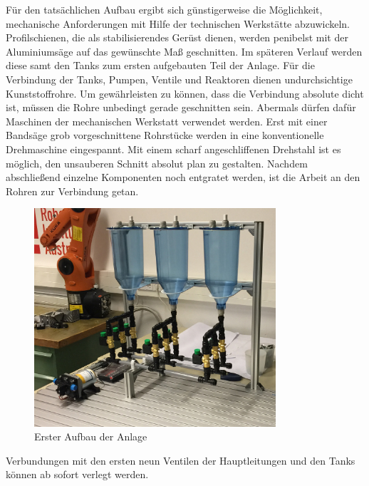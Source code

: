 	Für den tatsächlichen Aufbau ergibt sich günstigerweise die Möglichkeit, mechanische Anforderungen mit Hilfe der technischen Werkstätte abzuwickeln. Profilschienen, die als stabilisierendes Gerüst dienen, werden penibelst mit der Aluminiumsäge auf das gewünschte Maß geschnitten. Im späteren Verlauf werden diese samt den Tanks zum ersten aufgebauten Teil der Anlage. Für die Verbindung der Tanks, Pumpen, Ventile und Reaktoren dienen undurchsichtige Kunststoffrohre. Um gewährleisten zu können, dass die Verbindung absolute dicht ist, müssen die Rohre unbedingt gerade geschnitten sein. Abermals dürfen dafür Maschinen der mechanischen Werkstatt verwendet werden. Erst mit einer Bandsäge grob vorgeschnittene Rohrstücke werden in eine konventionelle Drehmaschine eingespannt. Mit einem scharf angeschliffenen Drehstahl ist es möglich, den unsauberen Schnitt absolut plan zu gestalten. Nachdem abschließend einzelne Komponenten noch entgratet werden, ist die Arbeit an den Rohren zur Verbindung getan.\\
	
	\begin{figure}[h!]
	  \centering
	  \includegraphics[width=0.8\textwidth]{graphics/implementation/ErsterAufbau.jpg}
	  \caption{Erster Aufbau der Anlage}
	  \label{fig:erster_aufbau}
	\end{figure}		
	
	Verbundungen mit den ersten neun Ventilen der Hauptleitungen und den Tanks können ab sofort verlegt werden.\\
		
